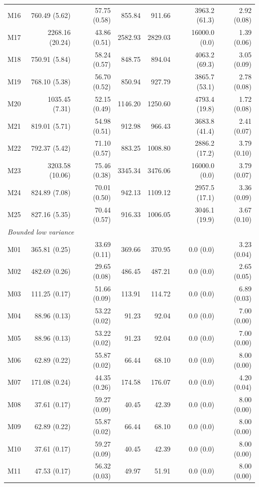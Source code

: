 \documentclass[11pt]{article}
\theoremstyle{remark}
\begin{document}
\begin{longtable}{lrrrrrr}
M16 & 760.49 (5.62) & 57.75 (0.58) & 855.84 & 911.66 & 3963.2 (61.3) & 2.92 (0.08) \\
M17 & 2268.16 (20.24) & 43.86 (0.51) & 2582.93 & 2829.03 & 16000.0 (0.0) & 1.39 (0.06) \\
M18 & 750.91 (5.84) & 58.24 (0.57) & 848.75 & 894.04 & 4063.2 (69.3) & 3.05 (0.09) \\
M19 & 768.10 (5.38) & 56.70 (0.52) & 850.94 & 927.79 & 3865.7 (53.1) & 2.78 (0.08) \\
M20 & 1035.45 (7.31) & 52.15 (0.49) & 1146.20 & 1250.60 & 4793.4 (19.8) & 1.72 (0.08) \\
M21 & 819.01 (5.71) & 54.98 (0.51) & 912.98 & 966.43 & 3683.8 (41.4) & 2.41 (0.07) \\
M22 & 792.37 (5.42) & 71.10 (0.57) & 883.25 & 1008.80 & 2886.2 (17.2) & 3.79 (0.10) \\
M23 & 3203.58 (10.06) & 75.46 (0.38) & 3345.34 & 3476.06 & 16000.0 (0.0) & 3.79 (0.07) \\
M24 & 824.89 (7.08) & 70.01 (0.50) & 942.13 & 1109.12 & 2957.5 (17.1) & 3.36 (0.09) \\
M25 & 827.16 (5.35) & 70.44 (0.57) & 916.33 & 1006.05 & 3046.1 (19.9) & 3.67 (0.10) \\
\multicolumn{7}{l}{\textit{Bounded low variance}} \\
M01 & 365.81 (0.25) & 33.69 (0.11) & 369.66 & 370.95 & 0.0 (0.0) & 3.23 (0.04) \\
M02 & 482.69 (0.26) & 29.65 (0.08) & 486.45 & 487.21 & 0.0 (0.0) & 2.65 (0.05) \\
M03 & 111.25 (0.17) & 51.66 (0.09) & 113.91 & 114.72 & 0.0 (0.0) & 6.89 (0.03) \\
M04 & 88.96 (0.13) & 53.22 (0.02) & 91.23 & 92.04 & 0.0 (0.0) & 7.00 (0.00) \\
M05 & 88.96 (0.13) & 53.22 (0.02) & 91.23 & 92.04 & 0.0 (0.0) & 7.00 (0.00) \\
M06 & 62.89 (0.22) & 55.87 (0.02) & 66.44 & 68.10 & 0.0 (0.0) & 8.00 (0.00) \\
M07 & 171.08 (0.24) & 44.35 (0.26) & 174.58 & 176.07 & 0.0 (0.0) & 4.20 (0.04) \\
M08 & 37.61 (0.17) & 59.27 (0.09) & 40.45 & 42.39 & 0.0 (0.0) & 8.00 (0.00) \\
M09 & 62.89 (0.22) & 55.87 (0.02) & 66.44 & 68.10 & 0.0 (0.0) & 8.00 (0.00) \\
M10 & 37.61 (0.17) & 59.27 (0.09) & 40.45 & 42.39 & 0.0 (0.0) & 8.00 (0.00) \\
M11 & 47.53 (0.17) & 56.32 (0.03) & 49.97 & 51.91 & 0.0 (0.0) & 8.00 (0.00) \\

\end{longtable}
\end{document}

